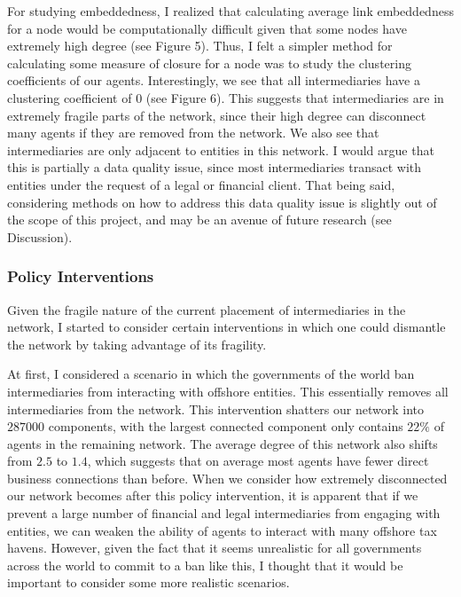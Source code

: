 \documentclass[11pt]{article}
\begin{document}
For studying embeddedness, I realized that calculating average link embeddedness
for a node would be computationally difficult given that some nodes have
extremely high degree (see Figure 5). Thus, I felt a simpler method for
calculating some measure of closure for a node was to study the clustering
coefficients of our agents. Interestingly, we see that all intermediaries have
a clustering coefficient of $0$ (see Figure 6). This suggests that
intermediaries are in extremely fragile parts of the network, since their
high degree can disconnect many agents if they are removed from the network. We
also see that intermediaries are only adjacent to entities in this network. I
would argue that this is partially a data quality issue, since most
intermediaries transact with entities under the request of a legal or financial
client. That being said, considering methods on how to address this data quality
issue is slightly out of the scope of this project, and may be an avenue of
future research (see Discussion).

\subsubsection{Policy Interventions}

Given the fragile nature of the current placement of intermediaries in the
network, I started to consider certain interventions in which one could
dismantle the network by taking advantage of its fragility.

At first, I considered a scenario in which the governments of the world ban
intermediaries from interacting with offshore entities. This essentially removes
all intermediaries from the network. This intervention shatters our network into
$287000$ components, with the largest connected component only contains $22\%$
of agents in the remaining network. The average degree of this network also
shifts from $2.5$ to $1.4$, which suggests that on average most agents have
fewer direct business connections than before. When we consider how extremely
disconnected our network becomes after this policy intervention, it is
apparent that if we prevent a large number of financial and legal intermediaries
from engaging with entities, we can weaken the ability of agents to interact
with many offshore tax havens. However, given the fact that it seems unrealistic
for all governments across the world to commit to a ban like this, I thought
that it would be important to consider some more realistic scenarios.
\end{document}
